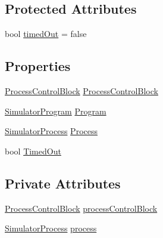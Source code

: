 \subsection*{Protected Attributes}
\begin{DoxyCompactItemize}
\item 
bool \hyperlink{class_c_p_u___o_s___simulator_1_1_operating___system_1_1_process_execution_unit_ad48af599eaa4929c947241f3d8bd754e}{timed\+Out} = false
\end{DoxyCompactItemize}
\subsection*{Properties}
\begin{DoxyCompactItemize}
\item 
\hyperlink{class_c_p_u___o_s___simulator_1_1_operating___system_1_1_process_control_block}{Process\+Control\+Block} \hyperlink{class_c_p_u___o_s___simulator_1_1_operating___system_1_1_process_execution_unit_a50dccf62e2bc43d1ad30f6488d3ffa58}{Process\+Control\+Block}
\item 
\hyperlink{class_c_p_u___o_s___simulator_1_1_c_p_u_1_1_simulator_program}{Simulator\+Program} \hyperlink{class_c_p_u___o_s___simulator_1_1_operating___system_1_1_process_execution_unit_a4a065d00dc99f2874bbfacbec4ff2b8c}{Program}
\item 
\hyperlink{class_c_p_u___o_s___simulator_1_1_operating___system_1_1_simulator_process}{Simulator\+Process} \hyperlink{class_c_p_u___o_s___simulator_1_1_operating___system_1_1_process_execution_unit_a869fb898b0a61e168220757d921e5bfc}{Process}
\item 
bool \hyperlink{class_c_p_u___o_s___simulator_1_1_operating___system_1_1_process_execution_unit_aa507b44c8134ffd0e9fbe702e1bf9e32}{Timed\+Out}
\end{DoxyCompactItemize}
\subsection*{Private Attributes}
\begin{DoxyCompactItemize}
\item 
\hyperlink{class_c_p_u___o_s___simulator_1_1_operating___system_1_1_process_control_block}{Process\+Control\+Block} \hyperlink{class_c_p_u___o_s___simulator_1_1_operating___system_1_1_process_execution_unit_ae2624c872da8f348b1a9fcba8d6734cf}{process\+Control\+Block}
\item 
\hyperlink{class_c_p_u___o_s___simulator_1_1_operating___system_1_1_simulator_process}{Simulator\+Process} \hyperlink{class_c_p_u___o_s___simulator_1_1_operating___system_1_1_process_execution_unit_a0a8944c15b618210fe91444a755991ca}{process}
\end{DoxyCompactItemize}


